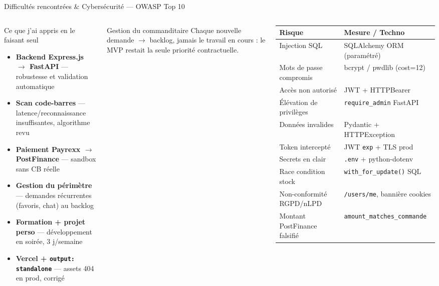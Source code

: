 \documentclass[aspectratio=169,10pt]{beamer}
\begin{document}
\begin{frame}{Difficultés rencontrées \& Cybersécurité --- OWASP Top 10}
  \begin{columns}[T]
    \begin{block}{\scriptsize Ce que j'ai appris en le faisant seul}
      \begin{itemize}\scriptsize
        \item \textbf{Backend Express.js $\rightarrow$ FastAPI} --- robustesse et validation automatique
        \item \textbf{Scan code-barres} --- latence/reconnaissance insuffisantes, algorithme revu
        \item \textbf{Paiement Payrexx $\rightarrow$ PostFinance} --- sandbox sans CB réelle
        \item \textbf{Gestion du périmètre} --- demandes récurrentes (favoris, chat) au backlog
        \item \textbf{Formation + projet perso} --- développement en soirée, 3 j/semaine
        \item \textbf{Vercel + \texttt{output: standalone}} --- assets 404 en prod, corrigé
      \end{itemize}
    \end{block}
    \vspace{4pt}
    \begin{exampleblock}{\scriptsize Gestion du commanditaire}
      \scriptsize
      Chaque nouvelle demande $\rightarrow$ backlog, jamais le travail en cours : le MVP
      restait la seule priorité contractuelle.
    \end{exampleblock}
    \tiny
    \renewcommand{\arraystretch}{1.2}
    \begin{tabular}{@{}p{2.5cm}p{3.0cm}@{}}
      \toprule
      \textbf{Risque} & \textbf{Mesure / Techno} \\
      \midrule
      Injection SQL               & SQLAlchemy ORM (paramétré) \\
      Mots de passe compromis     & bcrypt / pwdlib (cost=12) \\
      Accès non autorisé          & JWT + HTTPBearer \\
      Élévation de privilèges     & \texttt{require\_admin} FastAPI \\
      Données invalides           & Pydantic + HTTPException \\
      Token intercepté            & JWT \texttt{exp} + TLS prod \\
      Secrets en clair            & \texttt{.env} + python-dotenv \\
      Race condition stock        & \texttt{with\_for\_update()} SQL \\
      Non-conformité RGPD/nLPD    & \texttt{/users/me}, bannière cookies \\
      Montant PostFinance falsifié & \texttt{amount\_matches\_commande} \\
      \bottomrule
    \end{tabular}
  \end{columns}
\end{frame}
\end{document}
